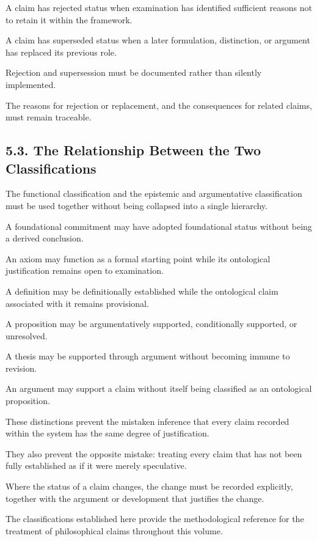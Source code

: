 A claim has rejected status
when examination has identified
sufficient reasons not to
retain it within the framework.

A claim has superseded status
when a later formulation,
distinction, or argument has
replaced its previous role.

Rejection and supersession
must be documented rather
than silently implemented.

The reasons for rejection
or replacement, and the
consequences for related
claims, must remain traceable.

\subsection*{5.3. The Relationship Between the Two Classifications}

The functional classification and
the epistemic and argumentative
classification must be used
together without being collapsed
into a single hierarchy.

A foundational commitment may
have adopted foundational status
without being a derived conclusion.

An axiom may function as a
formal starting point while
its ontological justification
remains open to examination.

A definition may be definitionally
established while the ontological
claim associated with it remains
provisional.

A proposition may be argumentatively
supported, conditionally supported,
or unresolved.

A thesis may be supported through
argument without becoming immune
to revision.

An argument may support a claim
without itself being classified
as an ontological proposition.

These distinctions prevent the
mistaken inference that every
claim recorded within the system
has the same degree of justification.

They also prevent the opposite
mistake: treating every claim
that has not been fully established
as if it were merely speculative.

Where the status of a claim changes,
the change must be recorded
explicitly, together with the
argument or development that
justifies the change.

The classifications established
here provide the methodological
reference for the treatment
of philosophical claims throughout
this volume.



